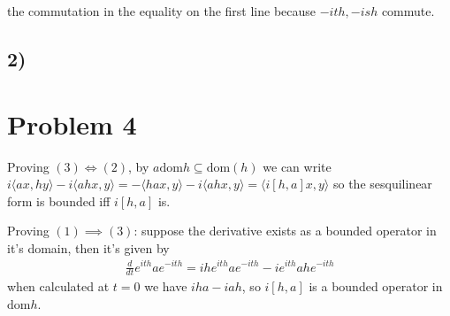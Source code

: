 \documentclass{article}
\begin{document}
the commutation in the equality on the first line because $-ith,-ish$ commute.


\subsection*{2)}




\section*{Problem 4}

Proving $(3)\iff (2)$, by $a\text{dom} h\subseteq \text{dom}(h) $ we can write 
$i\langle ax, hy\rangle-i\langle ahx, y\rangle=-\langle hax,y\rangle 
-i\langle ahx,y\rangle =\langle i[h,a]x,y\rangle$ so the sesquilinear form
is bounded iff $i[h,a]$ is.

Proving $(1)\implies (3)$:
suppose the derivative exists as a bounded operator in it's domain, then 
it's given by 
\begin{align}
    \frac{d}{dt} e^{ith}ae^{-ith}=ihe^{ith}ae^{-ith}-ie^{ith}ahe^{-ith}
\end{align}
when calculated at $t=0$ we have $iha-iah$, so $i[h,a]$ is a bounded operator 
in $\text{dom} h$.
\end{document}
